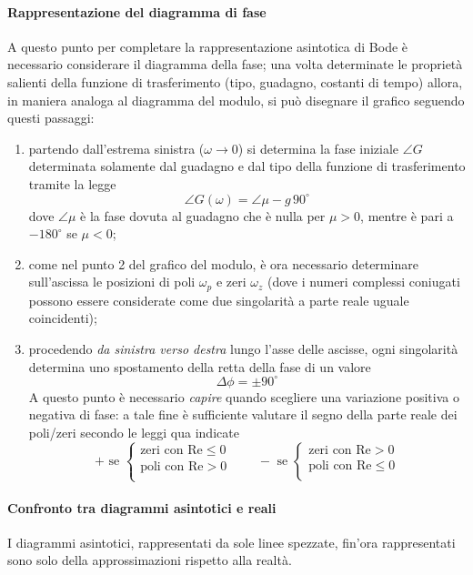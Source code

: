 		\paragraph{Rappresentazione del diagramma di fase} A questo punto per completare la rappresentazione asintotica di Bode è necessario considerare il diagramma della fase; una volta determinate le proprietà salienti della funzione di trasferimento (tipo, guadagno, costanti di tempo) allora, in maniera analoga al diagramma del modulo, si può disegnare il grafico seguendo questi passaggi:
		\begin{enumerate}
			\item partendo dall'estrema sinistra ($\omega\rightarrow 0$) si determina la fase iniziale $\angle G$ determinata solamente dal guadagno e dal tipo della funzione di trasferimento tramite la legge
			\[ \angle G(\omega) = \angle \mu - g\,90^\circ \]
			dove $\angle \mu$ è la fase dovuta al guadagno che è nulla per $\mu >0$, mentre è pari a $-180^\circ$ se $\mu < 0$;
			
			\item come nel punto 2 del grafico del modulo, è ora necessario determinare sull'ascissa le posizioni di poli $\omega_p$ e zeri $\omega_z$ (dove i numeri complessi coniugati possono essere considerate come due singolarità a parte reale uguale coincidenti);
			\item procedendo \textit{da sinistra verso destra} lungo l'asse delle ascisse, ogni singolarità determina uno spostamento della retta della fase di un valore
			\[ \Delta \phi = \pm 90^\circ \]
			A questo punto è necessario \textit{capire} quando scegliere una variazione positiva o negativa di fase: a tale fine è sufficiente valutare il segno della parte reale dei poli/zeri secondo le leggi qua indicate
			\[ + \textrm{ se } \begin{cases}
				\textrm{zeri con Re}\leq 0 \\
				\textrm{poli con Re}> 0 \\
			\end{cases} \qquad - \textrm{ se } \begin{cases}
			\textrm{zeri con Re}> 0 \\
			\textrm{poli con Re}\leq 0 \\
			\end{cases} \]
			
		\end{enumerate}
			
		\paragraph{Confronto tra diagrammi asintotici e reali} I diagrammi asintotici, rappresentati da sole linee spezzate, fin'ora rappresentati sono solo della approssimazioni rispetto alla realtà.
		
